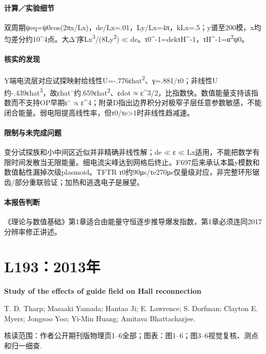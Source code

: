 \documentclass[UTF8,a4paper,11pt,openany,fontset=fandol]{ctexbook}
\begin{document}
\paragraph{计算／实验细节}双周期ψeq=ψ0cos(2πx/Lx)，de/Lx=.01，Ly/Lx=4π，kLx=.5；y谱至200模，x均匀差分约10\textasciicircum{}4点。大Δ'序Lx\textsuperscript{3}/(8Ly\textsuperscript{2})\ensuremath{\ll}de。τ0\textasciicircum{}-1=dekτH\textasciicircum{}-1，τH\textasciicircum{}-1=α\textsuperscript{2}ψ0。

\paragraph{核实的发现}Y端电流层对应试探映射给线性U=-.776εhat\textsuperscript{2}、γ=.881/τ0；非线性U约-.439εhat\textsuperscript{3}，故εhat¨约.659εhat\textsuperscript{2}、εdot\ensuremath{\propto}ε\textasciicircum{}3/2，比指数快。数值能量支持该指数而不支持OP早期ε¨\ensuremath{\propto}ε\textasciicircum{}4；附录D指出边界积分对极窄子层任意参数敏感，不能闭合能量。弱电阻提高线性率，但τ0/τe>1时非线性趋减速。

\paragraph{限制与未完成问题}变分试探族和小中间区近似并非精确非线性解；de\ensuremath{\ll}ε\ensuremath{\ll}Lx适用，不能把数学有限时间发散当无限能量。细电流尖峰达到网格后终止。F697后来承认本篇y模数和数值黏性漏掉次级plasmoid。TFTR τ0约90μs/τe270μs仅量级对应，非完整环形锯齿/部分重联验证；加热和逃逸电子是展望。

\paragraph{本报告判断}《理论与数值基础》第1章适合由能量守恒逐步推导爆发指数，第1章必须连同2017分辨率修正讲述。

\section{L193：2013年}\label{paper:L193}

\textbf{Study of the effects of guide field on Hall reconnection}\citep{L193}\

T. D. Tharp;  Masaaki Yamada;  Hantao Ji;  E. Lawrence;  S. Dorfman;  Clayton E. Myers;  Jongsoo Yoo;  Yi-Min Huang;  Amitava Bhattacharjee.

\textsf{核读范围：}作者公开期刊版物理页1–6全部；\textsf{图表：}图1–6；图3–6视觉复核、测点和归一细查.
\end{document}
